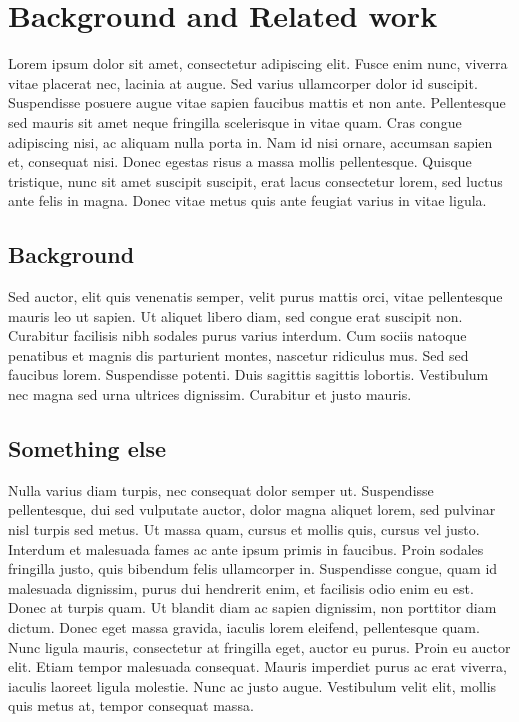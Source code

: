 \chapter{Background and Related work}
\label{chp:relatedwork}

Lorem ipsum dolor sit amet, consectetur adipiscing elit. Fusce enim nunc,
viverra vitae placerat nec, lacinia at augue. Sed varius ullamcorper dolor
id suscipit. Suspendisse posuere augue vitae sapien faucibus mattis et non
ante. Pellentesque sed mauris sit amet neque fringilla scelerisque in vitae
quam. Cras congue adipiscing nisi, ac aliquam nulla porta in. Nam id nisi
ornare, accumsan sapien et, consequat nisi. Donec egestas risus a massa
mollis pellentesque.  Quisque tristique, nunc sit amet suscipit suscipit, erat
lacus consectetur lorem, sed luctus ante felis in magna. Donec vitae metus
quis ante feugiat varius in vitae ligula.

\section{Background}
Sed auctor, elit quis venenatis semper, velit purus mattis orci, vitae
pellentesque mauris leo ut sapien. Ut aliquet libero diam, sed congue erat
suscipit non. Curabitur facilisis nibh sodales purus varius interdum. Cum
sociis natoque penatibus et magnis dis parturient montes, nascetur ridiculus
mus. Sed sed faucibus lorem. Suspendisse potenti. Duis sagittis sagittis
lobortis. Vestibulum nec magna sed urna ultrices dignissim. Curabitur et
justo mauris. 

\section{Something else}
Nulla varius diam turpis, nec consequat dolor semper ut. Suspendisse
pellentesque, dui sed vulputate auctor, dolor magna aliquet lorem, sed
pulvinar nisl turpis sed metus.  Ut massa quam, cursus et mollis quis, cursus
vel justo. Interdum et malesuada fames ac ante ipsum primis in faucibus.
Proin sodales fringilla justo, quis bibendum felis ullamcorper in.
Suspendisse congue, quam id malesuada dignissim, purus dui hendrerit enim,
et facilisis odio enim eu est. Donec at turpis quam. Ut blandit diam ac
sapien dignissim, non porttitor diam dictum.  Donec eget massa gravida,
iaculis lorem eleifend, pellentesque quam. Nunc ligula mauris, consectetur
at fringilla eget, auctor eu purus. Proin eu auctor elit. Etiam tempor
malesuada consequat. Mauris imperdiet purus ac erat viverra, iaculis laoreet
ligula molestie. Nunc ac justo augue.  Vestibulum velit elit, mollis quis metus
at, tempor consequat massa.

